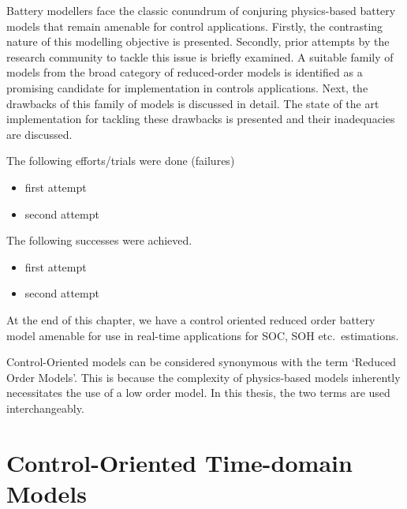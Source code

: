 



\graphicspath{{4/figures/}}

Battery modellers face the classic conundrum of conjuring physics-based battery models that remain amenable for control
applications. Firstly, the contrasting nature of this modelling objective is presented. Secondly, prior attempts by the
research community to tackle this issue is briefly examined. A suitable family of models from the broad category of
reduced-order models is identified as a promising candidate for implementation in controls applications. Next, the
drawbacks of this family of models is discussed in detail. The state of the art implementation for tackling these
drawbacks is presented and their inadequacies are discussed.

The following efforts/trials were done (failures)
\begin{itemize}
    \item first attempt
    \item second attempt
\end{itemize}
The following successes were achieved.
\begin{itemize}
    \item first attempt
    \item second attempt
\end{itemize}

At the end of this chapter, we have a control oriented reduced order battery model amenable for use in real-time
applications for SOC, SOH etc.\ estimations.

Control-Oriented models can be considered synonymous with the term `Reduced Order Models'. This is because the
complexity of physics-based models inherently necessitates the use of a low order model. In this thesis, the two terms
are used interchangeably.

\section{Control-Oriented Time-domain Models}


